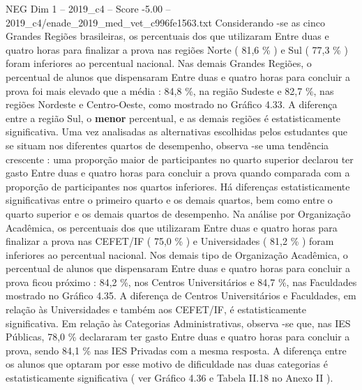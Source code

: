 \begin{textsample}{NEG Dim 1 – 2019\_c4 – Score -5.00 – 2019\_c4/enade\_2019\_med\_vet\_c996fe1563.txt}
Considerando -se as cinco Grandes Regiões brasileiras, os percentuais dos que utilizaram Entre duas e quatro horas para finalizar a prova nas regiões Norte ( 81,6 \% ) e Sul ( 77,3 \% ) foram inferiores ao percentual nacional.
Nas demais Grandes Regiões, o percentual de alunos que dispensaram Entre duas e quatro horas para concluir a prova foi mais elevado que a média : 84,8 \%, na região Sudeste e 82,7 \%, nas regiões Nordeste e Centro-Oeste, como mostrado no Gráfico 4.33.
A diferença entre a região Sul, o \textbf{menor} percentual, e as demais regiões é estatisticamente significativa.
Uma vez analisadas as alternativas escolhidas pelos estudantes que se situam nos diferentes quartos de desempenho, observa -se uma tendência crescente : uma proporção maior de participantes no quarto superior declarou ter gasto Entre duas e quatro horas para concluir a prova quando comparada com a proporção de participantes nos quartos inferiores.
Há diferenças estatisticamente significativas entre o primeiro quarto e os demais quartos, bem como entre o quarto superior e os demais quartos de desempenho.
Na análise por Organização Acadêmica, os percentuais dos que utilizaram Entre duas e quatro horas para finalizar a prova nas CEFET/IF ( 75,0 \% ) e Universidades ( 81,2 \% ) foram inferiores ao percentual nacional.
Nos demais tipo de Organização Acadêmica, o percentual de alunos que dispensaram Entre duas e quatro horas para concluir a prova ficou próximo : 84,2 \%, nos Centros Universitários e 84,7 \%, nas Faculdades mostrado no Gráfico 4.35.
A diferença de Centros Universitários e Faculdades, em relação às Universidades e também aos CEFET/IF, é estatisticamente significativa.
Em relação às Categorias Administrativas, observa -se que, nas IES Públicas, 78,0 \% declararam ter gasto Entre duas e quatro horas para concluir a prova, sendo 84,1 \% nas IES Privadas com a mesma resposta.
A diferença entre os alunos que optaram por esse motivo de dificuldade nas duas categorias é estatisticamente significativa ( ver Gráfico 4.36 e Tabela II.18 no Anexo II ).

\end{textsample}
